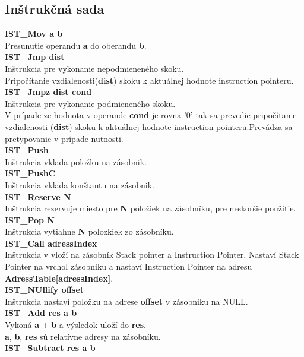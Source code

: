 \documentclass[12pt,a4paper,titlepage,final]{article}
\begin{document}
\subsection{Inštrukčná sada}

\textbf{IST\_Mov a b}\\
Presunutie operandu \textbf{a} do oberandu \textbf{b}. \\
\textbf{IST\_Jmp dist}\\
Inštrukcia pre vykonanie nepodmieneného skoku.\\
Pripočítanie vzdialenosti(\textbf{dist}) skoku k aktuálnej hodnote instruction
pointeru.\\
\textbf{IST\_Jmpz dist cond}\\
Inštrukcia pre vykonanie podmieneného skoku.\\
V prípade ze hodnota v operande \textbf{cond} je rovna '0' tak sa prevedie
pripočítanie vzdialenosti (\textbf{dist}) skoku k aktuálnej hodnote instruction
pointeru.Prevádza sa pretypovanie v prípade nutnosti.\\
\textbf{IST\_Push}\\
Inštrukcia vklada položku na zásobnik.\\
\textbf{IST\_PushC}\\
Inštrukcia vklada konštantu na zásobnik.\\
\textbf{IST\_Reserve N}\\
Inštrukcia rezervuje miesto pre \textbf{N} položiek na zásobníku, pre neskoršie
 použitie.\\
\textbf{IST\_Pop N}\\
Inštrukcia vytiahne \textbf{N} polozkiek zo zásobníku.\\
\textbf{IST\_Call adressIndex}\\
Inštrukcia v vloží na zásobník Stack pointer a Instruction Pointer. Nastaví
Stack Pointer na vrchol zásobniku a nastaví Instruction Pointer na adresu
\textbf{AdressTable[adressIndex]}.\\
\textbf{IST\_NUllify offset}\\
Inštrukcia nastaví položku na adrese \textbf{offset} v zásobniku na NULL.\\
\textbf{IST\_Add res a b}\\
Vykoná \textbf{a} + \textbf{b} a výsledok uloží do \textbf{res}.\\
\textbf{a}, \textbf{b}, \textbf{res} sú relatívne adresy na zásobníku.\\
\textbf{IST\_Subtract res a b}\\
\end{document}
